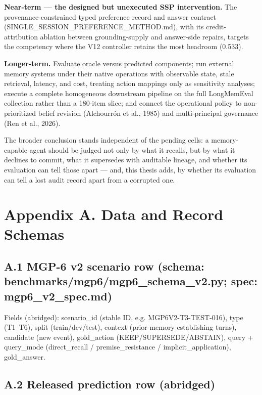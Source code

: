 \textbf{Near-term --- the designed but unexecuted SSP intervention.} The
provenance-constrained typed preference record and answer contract
(SINGLE\_SESSION\_PREFERENCE\_METHOD.md), with its credit-attribution
ablation between grounding-supply and answer-side repairs, targets the
competency where the V12 controller retains the most headroom (0.533).

\textbf{Longer-term.} Evaluate oracle versus predicted components; run
external memory systems under their native operations with observable
state, stale retrieval, latency, and cost, treating action mappings only
as sensitivity analyses; execute a complete homogeneous downstream
pipeline on the full LongMemEval collection rather than a 180-item
slice; and connect the operational policy to non-prioritized belief
revision (Alchourrón et al., 1985) and multi-principal governance (Ren
et al., 2026).

The broader conclusion stands independent of the pending cells: a
memory-capable agent should be judged not only by what it recalls, but
by what it declines to commit, what it supersedes with auditable
lineage, and whether its evaluation can tell those apart --- and, this
thesis adds, by whether its evaluation can tell a lost audit record
apart from a corrupted one.

\section{Appendix A. Data and Record
Schemas}\label{appendix-a.-data-and-record-schemas}

\subsection{A.1 MGP-6 v2 scenario row (schema:
benchmarks/mgp6/mgp6\_schema\_v2.py; spec:
mgp6\_v2\_spec.md)}\label{a.1-mgp-6-v2-scenario-row-schema-benchmarksmgp6mgp6_schema_v2.py-spec-mgp6_v2_spec.md}

Fields (abridged): scenario\_id (stable ID, e.g. MGP6V2-T3-TEST-016),
type (T1--T6), split (train/dev/test), context
(prior-memory-establishing turns), candidate (new event), gold\_action
(KEEP/SUPERSEDE/ABSTAIN), query + query\_mode (direct\_recall /
premise\_resistance / implicit\_application), gold\_answer.

\subsection{A.2 Released prediction row
(abridged)}\label{a.2-released-prediction-row-abridged}

